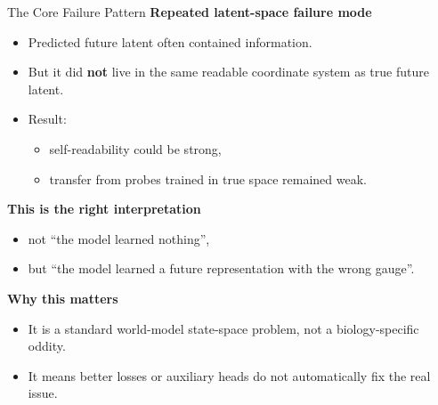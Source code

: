 \documentclass[aspectratio=169,11pt]{beamer}
\begin{document}
\begin{frame}{The Core Failure Pattern}
\textbf{Repeated latent-space failure mode}
\begin{itemize}
    \item Predicted future latent often contained information.
    \item But it did \textbf{not} live in the same readable coordinate system as true future latent.
    \item Result:
    \begin{itemize}
        \item self-readability could be strong,
        \item transfer from probes trained in true space remained weak.
    \end{itemize}
\end{itemize}

\vspace{0.5em}
\textbf{This is the right interpretation}
\begin{itemize}
    \item not ``the model learned nothing'',
    \item but ``the model learned a future representation with the wrong gauge''.
\end{itemize}

\vspace{0.5em}
\textbf{Why this matters}
\begin{itemize}
    \item It is a standard world-model state-space problem, not a biology-specific oddity.
    \item It means better losses or auxiliary heads do not automatically fix the real issue.
\end{itemize}
\end{frame}
\end{document}
